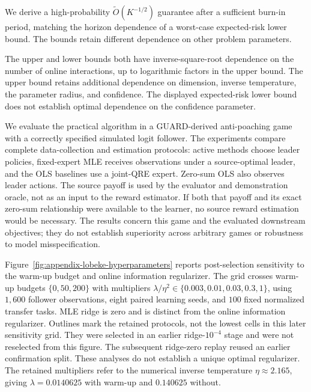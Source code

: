 
We derive a high-probability $\widetilde O(K^{-1/2})$ guarantee after a sufficient
burn-in period, matching the horizon dependence of a worst-case expected-risk
lower bound. The bounds retain different dependence on other problem parameters.

The upper and lower bounds both have inverse-square-root dependence on the
number of online interactions, up to logarithmic factors in the upper bound.
The upper bound retains additional dependence on dimension, inverse temperature,
the parameter radius, and confidence. The displayed expected-risk lower bound
does not establish optimal dependence on the confidence parameter.

We evaluate the practical algorithm in a GUARD-derived anti-poaching game with
a correctly specified simulated logit follower. The experiments compare complete
data-collection and estimation protocols: active methods choose leader policies,
fixed-expert MLE receives observations under a source-optimal leader, and the
OLS baselines use a joint-QRE expert. Zero-sum OLS also observes leader actions.
The source payoff is used by the evaluator and demonstration oracle, not as an
input to the reward estimator. If both that payoff and its exact zero-sum
relationship were available to the learner, no source reward estimation would
be necessary.
The results concern this game and the evaluated downstream objectives; they do
not establish superiority across arbitrary games or robustness to model
misspecification.

Figure~\ref{fig:appendix-lobeke-hyperparameters} reports post-selection sensitivity
to the warm-up budget and online information regularizer. The grid crosses
warm-up budgets $\{0,50,200\}$ with multipliers
$\lambda/\eta^2\in\{0.003,0.01,0.03,0.3,1\}$, using $1{,}600$ follower observations,
eight paired learning seeds, and $100$ fixed normalized transfer tasks. MLE ridge
is zero and is distinct from the online information regularizer. Outlines mark
the retained protocols, not the lowest cells in this later sensitivity grid.
They were selected in an earlier ridge-$10^{-4}$ stage and were not reselected
from this figure. The subsequent ridge-zero replay reused an earlier confirmation
split. These analyses do not establish a unique optimal regularizer.
The retained multipliers refer to the numerical inverse temperature
$\eta\approx2.165$, giving $\lambda=0.0140625$ with warm-up and $0.140625$ without.


